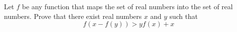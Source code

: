 Let $f$ be any function that maps the set of real numbers into the set of real numbers. Prove that there exist real numbers $x$ and $y$ such that \[f\left(x-f(y)\right)>yf(x)+x\]